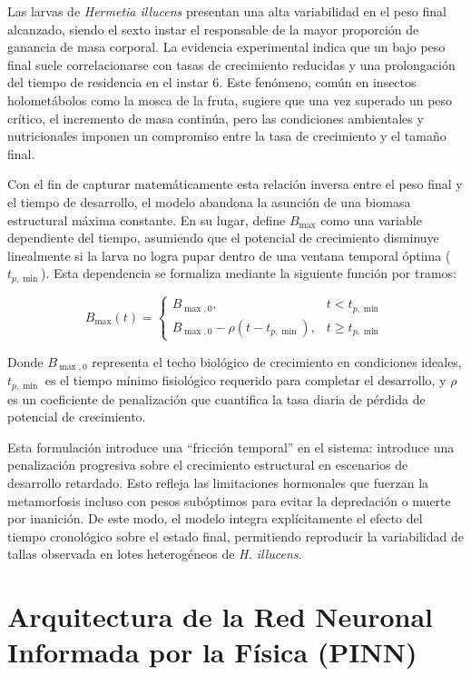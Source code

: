 Las larvas de \textit{Hermetia illucens} presentan una alta variabilidad en el peso final alcanzado, 
siendo el sexto instar el responsable de la mayor proporción de ganancia de masa corporal. 
La evidencia experimental indica que un bajo peso final suele correlacionarse con tasas de 
crecimiento reducidas y una prolongación del tiempo de residencia en el instar 6. Este fenómeno, 
común en insectos holometábolos como la mosca de la fruta, sugiere que una vez superado un 
peso crítico, el incremento de masa continúa, pero las condiciones ambientales y nutricionales 
imponen un compromiso entre la tasa de crecimiento y el tamaño final.

Con el fin de capturar matemáticamente esta relación inversa entre el peso final y el tiempo de 
desarrollo, el modelo abandona la asunción de una biomasa estructural máxima constante. En su 
lugar, define $B_{\max}$ como una variable dependiente del tiempo, asumiendo que el potencial 
de crecimiento disminuye linealmente si la larva no logra pupar dentro de una ventana temporal 
óptima ($t_{p,\min}$). Esta dependencia se formaliza mediante la siguiente función por tramos:

\begin{equation}
B_{\max}(t) =
\begin{cases}
B_{\max,0}, & t < t_{p,\min} \\[8pt]
B_{\max,0} - \rho \left( t - t_{p,\min} \right), & t \geq t_{p,\min}
\end{cases}
\label{eq:Bmax_time}
\end{equation}

Donde $B_{\max,0}$ representa el techo biológico de crecimiento en condiciones ideales, $t_{p,\min}$ 
es el tiempo mínimo fisiológico requerido para completar el desarrollo, y $\rho$ es un coeficiente 
de penalización que cuantifica la tasa diaria de pérdida de potencial de crecimiento.

Esta formulación introduce una ``fricción temporal'' en el sistema: introduce una penalización 
progresiva sobre el crecimiento estructural en escenarios de desarrollo retardado. Esto refleja 
las limitaciones hormonales que fuerzan la metamorfosis incluso con pesos subóptimos para evitar 
la depredación o muerte por inanición. De este modo, el modelo integra explícitamente el efecto 
del tiempo cronológico sobre el estado final, permitiendo reproducir la variabilidad de tallas 
observada en lotes heterogéneos de \textit{H. illucens}.

\section{Arquitectura de la Red Neuronal Informada por la Física (PINN)}

